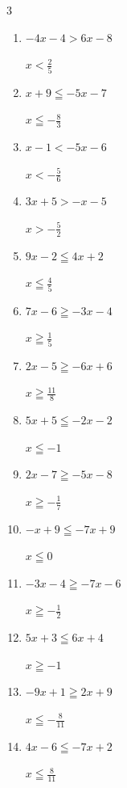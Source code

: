 \begin{multicols}{3}
\begin{enumerate}
  \item $-4x-4>6x-8$

        $\displaystyle x<\frac{2}{5}$

  \item $x+9\leqq -5x-7$

        $\displaystyle x\leqq -\frac{8}{3}$

  \item $x-1<-5x-6$

        $\displaystyle x<-\frac{5}{6}$

  \item $3x+5>-x-5$

        $\displaystyle x>-\frac{5}{2}$

  \item $9x-2\leqq 4x+2$

        $\displaystyle x\leqq \frac{4}{5}$

  \item $7x-6\geqq -3x-4$

        $\displaystyle x\geqq \frac{1}{5}$

  \item $2x-5\geqq -6x+6$

        $\displaystyle x\geqq \frac{11}{8}$

  \item $5x+5\leqq -2x-2$

        $\displaystyle x\leqq -1$

  \item $2x-7\geqq -5x-8$

        $\displaystyle x\geqq -\frac{1}{7}$

  \item $-x+9\leqq -7x+9$

        $\displaystyle x\leqq 0$

  \item $-3x-4\geqq -7x-6$

        $\displaystyle x\geqq -\frac{1}{2}$

  \item $5x+3\leqq 6x+4$

        $\displaystyle x\geqq -1$

\columnbreak %

  \item $-9x+1\geqq 2x+9$

        $\displaystyle x\leqq -\frac{8}{11}$

  \item $4x-6\leqq -7x+2$

        $\displaystyle x\leqq \frac{8}{11}$


\end{enumerate}
\end{multicols}
